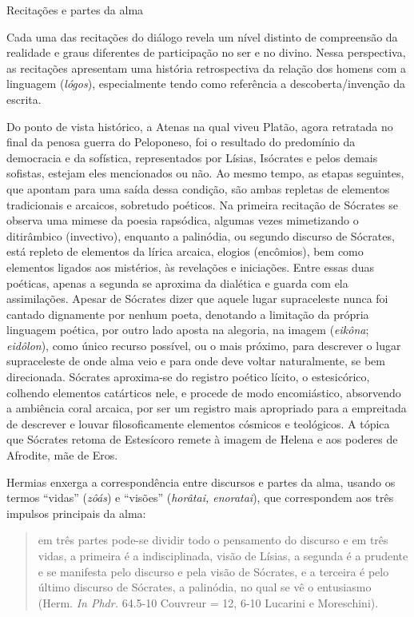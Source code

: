 Recitações e partes da alma

Cada uma das recitações do diálogo revela um nível distinto de
compreensão da realidade e graus diferentes de participação no ser e no
divino. Nessa perspectiva, as recitações apresentam uma história
retrospectiva da relação dos homens com a linguagem (\emph{lógos}),
especialmente tendo como referência a descoberta/invenção da escrita.

Do ponto de vista histórico, a Atenas na qual viveu Platão, agora
retratada no final da penosa guerra do Peloponeso, foi o resultado do
predomínio da democracia e da sofística, representados por Lísias,
Isócrates e pelos demais sofistas, estejam eles mencionados ou não. Ao
mesmo tempo, as etapas seguintes, que apontam para uma saída dessa
condição, são ambas repletas de elementos tradicionais e arcaicos,
sobretudo poéticos. Na primeira recitação de Sócrates se observa uma
mimese da poesia rapsódica, algumas vezes mimetizando o ditirâmbico
(invectivo), enquanto a palinódia, ou segundo discurso de Sócrates, está
repleto de elementos da lírica arcaica, elogios (encômios), bem como
elementos ligados aos mistérios, às revelações e iniciações. Entre essas
duas poéticas, apenas a segunda se aproxima da dialética e guarda com
ela assimilações. Apesar de Sócrates dizer que aquele lugar supraceleste
nunca foi cantado dignamente por nenhum poeta, denotando a limitação da
própria linguagem poética, por outro lado aposta na alegoria, na imagem
(\emph{eikôna}; \emph{eidôlon}), como único recurso possível, ou o mais
próximo, para descrever o lugar supraceleste de onde alma veio e para
onde deve voltar naturalmente, se bem direcionada. Sócrates aproxima-se
do registro poético lícito, o estesicórico, colhendo elementos
catárticos nele, e procede de modo encomiástico, absorvendo a ambiência
coral arcaica, por ser um registro mais apropriado para a empreitada de
descrever e louvar filosoficamente elementos cósmicos e teológicos. A
tópica que Sócrates retoma de Estesícoro remete à imagem de Helena e aos
poderes de Afrodite, mãe de Eros.

Hermias enxerga a correspondência entre discursos e partes da alma,
usando os termos ``vidas'' (\emph{zôás}) e ``visões'' (\emph{horâtai,
enoratai}), que correspondem aos três impulsos principais da alma:

\begin{quote}
em três partes pode-se dividir todo o pensamento do discurso e em três
vidas, a primeira é a indisciplinada, visão de Lísias, a segunda é a
prudente e se manifesta pelo discurso e pela visão de Sócrates, e a
terceira é pelo último discurso de Sócrates, a palinódia, no qual se vê
o entusiasmo (Herm. \emph{In Phdr.} 64.5-10 Couvreur = 12, 6-10 Lucarini
e Moreschini).
\end{quote}

